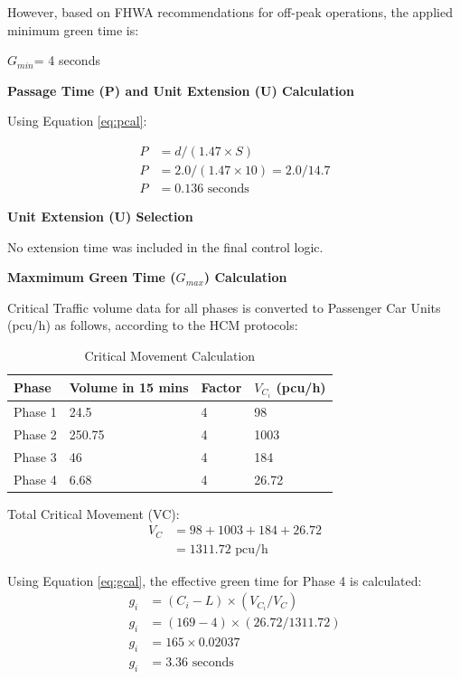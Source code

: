 However, based on FHWA recommendations for off-peak operations, 
the applied minimum green time is:

\begin{center}
    $G_{min}$= 4 seconds
\end{center}

\textbf{Passage Time (P) and Unit Extension (U) Calculation}

Using Equation \eqref{eq:pcal}:

\begin{align*}
P &= d / (1.47 \times S) \\
P &= 2.0 / (1.47 \times 10) = 2.0 / 14.7 \\
P &= 0.136 \text{ seconds}
\end{align*}


 \textbf{Unit Extension (U) Selection}

  No extension time was included in the final control logic.

 \textbf{Maxmimum Green Time ($G_{max}$) Calculation}

 Critical Traffic volume data for all phases is converted to Passenger Car 
 Units (pcu/h) as follows, according to the HCM protocols:

 \begin{table}[h]
    \centering
    \caption{Critical Movement Calculation}
    \begin{tabular}{|l|l|l|l|}
        \hline
        \textbf{Phase} & \textbf{Volume in 15 mins} & \textbf{Factor} & \textbf{$V_{C_i}$ (pcu/h)} \\
        \hline
        Phase 1 & 24.5& 4 & 98 \\
        \hline
        Phase 2 & 250.75 & 4 & 1003 \\
        \hline
        Phase 3 & 46 & 4 & 184 \\
        \hline
        Phase 4 & 6.68 & 4 & 26.72 \\
        \hline
        
    \end{tabular}
 \end{table}

 
 Total Critical Movement (VC):
\begin{align*}
V_C &= 98 + 1003 + 184 + 26.72 \\
&= 1311.72 \text{ pcu/h}
\end{align*}



Using Equation \eqref{eq:gcal}, the effective green time for Phase 4  is calculated:
\begin{align*}
    g_i &= (C_i - L) \times (V_{C_i} / V_C) \\
    g_i &= (169 - 4) \times (26.72 / 1311.72) \\
    g_i &= 165 \times 0.02037 \\
    g_i &= 3.36 \text{ seconds}
\end{align*}



